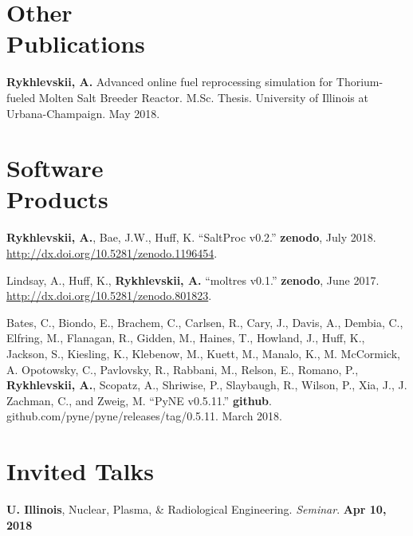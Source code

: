 \documentclass[margin,line]{resume}
\begin{document}
\begin{resume}
\section{\mysidestyle Other\\Publications}
\begin{bibenum}
	\item \textbf{Rykhlevskii, A.} Advanced  online fuel reprocessing 
	simulation for Thorium-fueled Molten Salt Breeder Reactor.
	M.Sc. Thesis. University of Illinois at Urbana-Champaign.  May 2018.
\end{bibenum}
\section{\mysidestyle Software\\Products}
\begin{bibenum}
	\item \textbf{Rykhlevskii, A.}, Bae, J.W., Huff, K. ``SaltProc v0.2.'' 
	\textbf{zenodo}, July 2018.
	\url{http://dx.doi.org/10.5281/zenodo.1196454}.
	
	\item Lindsay, A., Huff, K., \textbf{Rykhlevskii, A.} ``moltres v0.1.'' 
	\textbf{zenodo}, June 2017. \url{http://dx.doi.org/10.5281/zenodo.801823}.
	
	\item Bates, C., Biondo, E., Brachem, C., Carlsen, R., Cary, J., Davis, 
	A., Dembia, C., Elfring, M., Flanagan, R., Gidden, M., Haines, T., 
	Howland, J., Huff, K., Jackson, S., Kiesling, K., Klebenow, M., Kuett, M., 
	Manalo, K., M. McCormick, A. Opotowsky, C., Pavlovsky, R., Rabbani, M., 
	Relson, E., Romano, P., \textbf{Rykhlevskii, A.}, Scopatz, A., Shriwise, 
	P., Slaybaugh, R., Wilson, P., Xia, J., J. Zachman, C., and Zweig, M. 
	``PyNE v0.5.11.'' \textbf{github}. 
	github.com/pyne/pyne/releases/tag/0.5.11. March 2018. 
\end{bibenum}
    \section{\mysidestyle Invited Talks}
      \textbf{U. Illinois}, Nuclear, Plasma, \& Radiological Engineering. \emph{Seminar}.  \hfill\textbf{Apr 10, 2018}\\

\end{resume}
\end{document}
